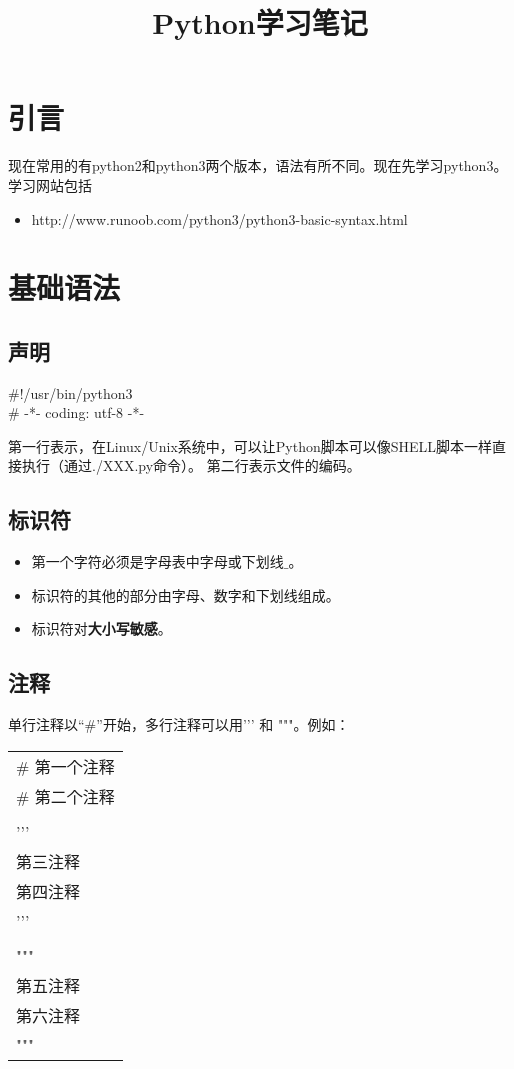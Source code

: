 \documentclass{article}
\begin{document}
\title{Python学习笔记}
\date{}
\author{}
\maketitle

\section{引言}
现在常用的有python2和python3两个版本，语法有所不同。现在先学习python3。学习网站包括
\begin{itemize}
\item http://www.runoob.com/python3/python3-basic-syntax.html
\end{itemize}

\section{基础语法}
\subsection{声明}
\begin{center}
\#!/usr/bin/python3\\
\# -*- coding: utf-8 -*-
\end{center}
第一行表示，在Linux/Unix系统中，可以让Python脚本可以像SHELL脚本一样直接执行（通过./XXX.py命令）。
第二行表示文件的编码。

\subsection{标识符}
\begin{itemize}
\item 第一个字符必须是字母表中字母或下划线$\_$。
\item 标识符的其他的部分由字母、数字和下划线组成。
\item 标识符对\textbf{大小写敏感}。
\end{itemize}

\subsection{注释}
单行注释以“$\#$”开始，多行注释可以用'{}'{}' 和 "{}"{}"。例如：
\begin{table}[htp]
\centering
\begin{tabular}{|l|}
\hline
\# 第一个注释\\
\# 第二个注释\\
\\
'{}'{}'\\
第三注释\\
第四注释\\
'{}'{}'\\
\\
"{}"{}"\\
第五注释\\
第六注释\\
"{}"{}"\\\hline
\end{tabular}
\end{table}
\end{document}
